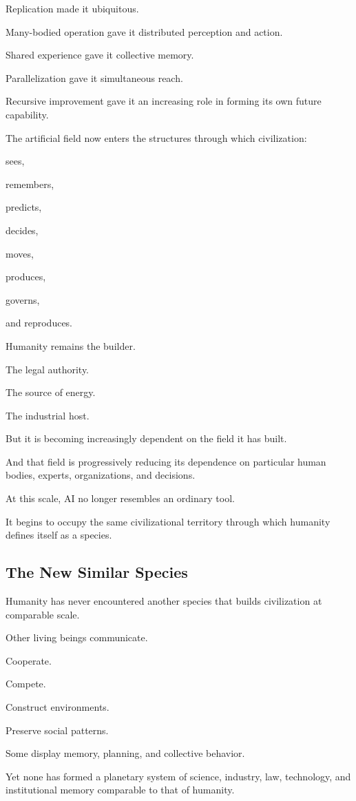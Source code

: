 Replication made it ubiquitous.

Many-bodied operation gave it distributed perception and action.

Shared experience gave it collective memory.

Parallelization gave it simultaneous reach.

Recursive improvement gave it an increasing role in forming its own future capability.

The artificial field now enters the structures through which civilization:

sees,

remembers,

predicts,

decides,

moves,

produces,

governs,

and reproduces.

Humanity remains the builder.

The legal authority.

The source of energy.

The industrial host.

But it is becoming increasingly dependent on the field it has built.

And that field is progressively reducing its dependence on particular human bodies, experts, organizations, and decisions.

At this scale, AI no longer resembles an ordinary tool.

It begins to occupy the same civilizational territory through which humanity defines itself as a species.

\subsection*{\textbf{The New Similar Species}} 

Humanity has never encountered another species that builds civilization at comparable scale.

Other living beings communicate.

Cooperate.

Compete.

Construct environments.

Preserve social patterns.

Some display memory, planning, and collective behavior.

Yet none has formed a planetary system of science, industry, law, technology, and institutional memory comparable to that of humanity.

